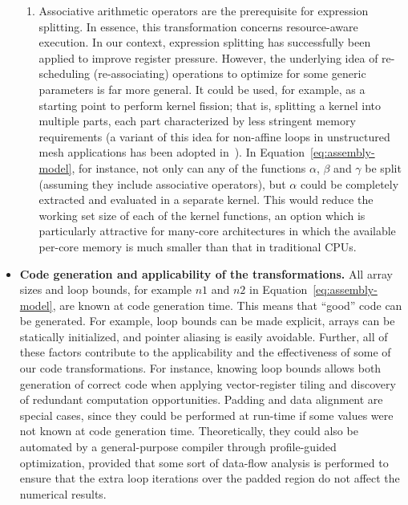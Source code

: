 \begin{itemize}
\begin{enumerate}
\item Associative arithmetic operators are the prerequisite for expression splitting. In essence, this transformation concerns resource-aware execution. In our context, expression splitting has successfully been applied to improve register pressure. However, the underlying idea of re-scheduling (re-associating) operations to optimize for some generic parameters is far more general. It could be used, for example, as a starting point to perform kernel fission; that is, splitting a kernel into multiple parts, each part characterized by less stringent memory requirements (a variant of this idea for non-affine loops in unstructured mesh applications has been adopted in~\citep{op2-lcpc}). In Equation~\eqref{eq:assembly-model}, for instance, not only can any of the functions $\alpha$, $\beta$ and $\gamma$ be split (assuming they include associative operators), but $\alpha$ could be completely extracted and evaluated in a separate kernel. This would reduce the working set size of each of the kernel functions, an option which is particularly attractive for many-core architectures in which the available per-core memory is much smaller than that in traditional CPUs.
\end{enumerate}
\item \textbf{Code generation and applicability of the transformations.} All array sizes and loop bounds, for example $n1$ and $n2$ in Equation~\ref{eq:assembly-model}, are known at code generation time. This means that ``good'' code can be generated. For example, loop bounds can be made explicit, arrays can be statically initialized, and pointer aliasing is easily avoidable. Further, all of these factors contribute to the applicability and the effectiveness of some of our code transformations. For instance, knowing loop bounds allows both generation of correct code when applying vector-register tiling and discovery of redundant computation  opportunities. Padding and data alignment are special cases, since they could be performed at run-time if some values were not known at code generation time. Theoretically, they could also be automated by a general-purpose compiler through profile-guided optimization, provided that some sort of data-flow analysis is performed to ensure that the extra loop iterations over the padded region do not affect the numerical results. 

\end{itemize}
